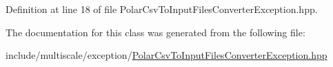 Definition at line 18 of file Polar\-Csv\-To\-Input\-Files\-Converter\-Exception.\-hpp.



The documentation for this class was generated from the following file\-:\begin{DoxyCompactItemize}
\item 
include/multiscale/exception/\hyperlink{PolarCsvToInputFilesConverterException_8hpp}{Polar\-Csv\-To\-Input\-Files\-Converter\-Exception.\-hpp}\end{DoxyCompactItemize}
